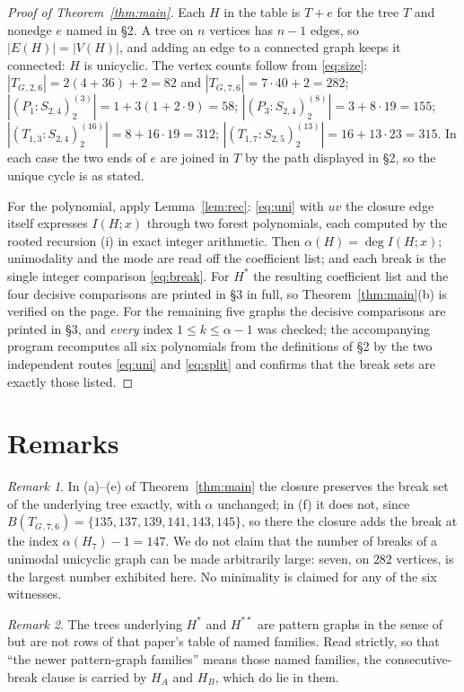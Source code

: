 \documentclass[11pt]{amsart}
\theoremstyle{definition}
\theoremstyle{remark}
\newtheorem*{remark}{Remark}
\newcommand{\Ip}{I}
\newcommand{\albr}{\alpha}
\newcommand{\TG}{T_{G}}
\begin{document}
\begin{proof}[Proof of Theorem~\ref{thm:main}]
Each $H$ in the table is $T+e$ for the tree $T$ and nonedge $e$ named in \S2. A tree
on $n$ vertices has $n-1$ edges, so $|E(H)|=|V(H)|$, and adding an edge to a
connected graph keeps it connected: $H$ is unicyclic. The vertex counts follow from
\eqref{eq:size}: $|\TG{}_{,2,6}|=2(4+36)+2=82$ and $|\TG{}_{,7,6}|=7\cdot40+2=282$;
$|(P_1:S_{2,4})_2^{(3)}|=1+3(1+2\cdot9)=58$;
$|(P_3:S_{2,4})_2^{(8)}|=3+8\cdot19=155$;
$|(T_{1,3}:S_{2,4})_2^{(16)}|=8+16\cdot19=312$;
$|(T_{1,7}:S_{2,5})_2^{(13)}|=16+13\cdot23=315$. In each case the two ends of $e$ are
joined in $T$ by the path displayed in \S2, so the unique cycle is as stated.

For the polynomial, apply Lemma~\ref{lem:rec}: \eqref{eq:uni} with $uv$ the closure
edge itself expresses $\Ip(H;x)$ through two forest polynomials, each computed by the
rooted recursion (i) in exact integer arithmetic. Then $\albr(H)=\deg\Ip(H;x)$;
unimodality and the mode are read off the coefficient list; and each break is the
single integer comparison \eqref{eq:break}. For $H^*$ the resulting coefficient list
and the four decisive comparisons are printed in \S3 in full, so
Theorem~\ref{thm:main}(b) is verified on the page. For the remaining five graphs the
decisive comparisons are printed in \S3, and \emph{every} index $1\le k\le\albr-1$ was
checked; the accompanying program recomputes all six polynomials from the definitions
of \S2 by the two independent routes \eqref{eq:uni} and \eqref{eq:split} and confirms
that the break sets are exactly those listed.
\end{proof}

\section{Remarks}

\begin{remark}
In (a)--(e) of Theorem~\ref{thm:main} the closure preserves the break set of the
underlying tree exactly, with $\albr$ unchanged; in (f) it does not, since
$B(\TG{}_{,7,6})=\{135,137,139,141,143,145\}$, so there the closure adds the break at
the index $\albr(H_7)-1=147$. We do not claim that the number of breaks of a unimodal
unicyclic graph can be made arbitrarily large: seven, on $282$ vertices, is the largest
number exhibited here. No minimality is claimed for any of the six witnesses.
\end{remark}

\begin{remark}
The trees underlying $H^*$ and $H^{**}$ are pattern graphs in the sense of \cite{BRGG}
but are not rows of that paper's table of named families. Read strictly, so that ``the
newer pattern-graph families'' means those named families, the consecutive-break clause
is carried by $H_A$ and $H_B$, which do lie in them.
\end{remark}
\end{document}
